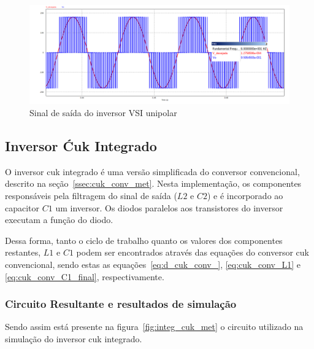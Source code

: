 \documentclass[
	12pt,				%
	openany,
	onseside,
	a4paper,			%
	english,			%
	french,				%
	spanish,			%
	brazil,				%
	]{abntex2}
\begin{document}
\begin{figure}[H]%
	\centering
		\includegraphics[width= \linewidth]{vsi_uni_out}
		\caption{Sinal de saída do inversor VSI unipolar}
		\label{fig:response_vsi_uni}
\end{figure}

\subsection{Inversor Ćuk Integrado}

O inversor cuk integrado é uma versão simplificada do conversor convencional, descrito na seção~\ref{ssec:cuk_conv_met}. Nesta implementação, os componentes responsáveis pela filtragem do sinal de saída ($L2$ e $C2$) e é incorporado ao capacitor $C1$ um inversor. Os diodos paralelos aos transistores do inversor executam a função do diodo.

Dessa forma, tanto o ciclo de trabalho quanto os valores dos componentes restantes, $L1$ e $C1$ podem ser encontrados através das equações do conversor cuk convencional, sendo estas as equações~\ref{eq:d_cuk_conv_}, \ref{eq:cuk_conv_L1} e \ref{eq:cuk_conv_C1_final}, respectivamente.

\subsubsection{Circuito Resultante e resultados de simulação}

Sendo assim está presente na figura~\ref{fig:integ_cuk_met} o circuito utilizado na simulação do inversor cuk integrado.
\end{document}

